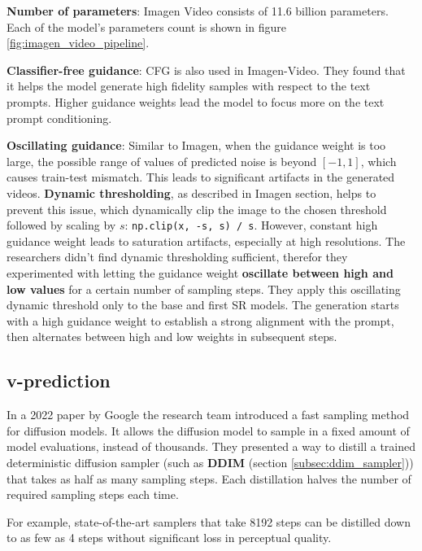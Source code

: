 \textbf{Number of parameters}: Imagen Video consists of 11.6 billion parameters. Each of the model's parameters count is shown in figure \ref{fig:imagen_video_pipeline}.

\textbf{Classifier-free guidance}: CFG is also used in Imagen-Video. They found that it helps the model generate high fidelity samples with respect to the text prompts. Higher guidance weights lead the model to focus more on the text prompt conditioning.

\textbf{Oscillating guidance}: Similar to Imagen, when the guidance weight is too large, the possible range of values of predicted noise is beyond $[-1, 1]$, which causes train-test mismatch. This leads to significant artifacts in the generated videos. \textbf{Dynamic thresholding}, as described in Imagen section, helps to prevent this issue, which dynamically clip the image to the chosen threshold followed by scaling by $s$: \texttt{np.clip(x, -s, s) / s}. However, constant high guidance weight leads to saturation artifacts, especially at high resolutions. The researchers didn't find dynamic thresholding sufficient, therefor they experimented with letting the guidance weight \textbf{oscillate between high and low values} for a certain number of sampling steps. They apply this oscillating dynamic threshold only to the base and first SR models. The generation starts with a high guidance weight to establish a strong alignment with the prompt, then alternates between high and low weights in subsequent steps.



\subsection{v-prediction}

In a 2022 paper by Google \cite{salimans2022progressive} the research team introduced a fast sampling method for diffusion models. It allows the diffusion model to sample in a fixed amount of model evaluations, instead of thousands. They presented a way to distill a trained deterministic diffusion sampler (such as \textbf{DDIM} (section \ref{subsec:ddim_sampler})) that takes as half as many sampling steps. Each distillation halves the number of required sampling steps each time.

For example, state-of-the-art samplers that take 8192 steps can be distilled down to as few as 4 steps without significant loss in perceptual quality.

